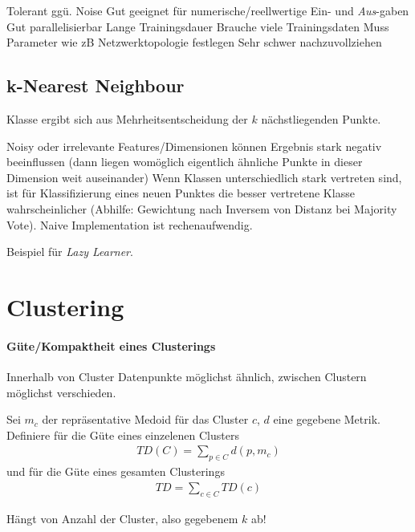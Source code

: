 \documentclass[10pt]{article} %
\begin{document}
\begin{cptitemize}
  \advantageit Tolerant ggü. Noise
  \advantageit Gut geeignet für numerische/reellwertige Ein- und \textit{Aus}-gaben
  \advantageit Gut parallelisierbar
  \disadvantageit Lange Trainingsdauer
  \disadvantageit Brauche viele Trainingsdaten
  \disadvantageit Muss Parameter wie zB Netzwerktopologie festlegen
  \disadvantageit Sehr schwer nachzuvollziehen
\end{cptitemize}

\subsection{k-Nearest Neighbour} 
Klasse ergibt sich aus Mehrheitsentscheidung der $k$ nächstliegenden Punkte.
\begin{cptitemize}
  \disadvantageit Noisy oder irrelevante Features/Dimensionen können Ergebnis
  stark negativ beeinflussen (dann liegen womöglich eigentlich ähnliche Punkte in
  dieser Dimension weit auseinander)
  \disadvantageit Wenn Klassen unterschiedlich stark vertreten sind, ist für
  Klassifizierung eines neuen Punktes die besser vertretene Klasse
  wahrscheinlicher (Abhilfe: Gewichtung nach Inversem von Distanz bei Majority Vote).
  \disadvantageit Naive Implementation ist rechenaufwendig.
\end{cptitemize}
Beispiel für \textit{Lazy Learner}.

\pagebreak
\section{Clustering}
\label{sec:clustering-algorithms}
\localtableofcontents

 \paragraph{Güte/Kompaktheit eines Clusterings} 
Innerhalb von Cluster Datenpunkte möglichst ähnlich, zwischen Clustern möglichst verschieden.
 \begin{definition}[TD] 
 Sei $m_c$ der repräsentative Medoid für das Cluster $c$, $d$ eine gegebene Metrik. Definiere für die Güte eines einzelenen Clusters
 \begin{align*} 
     TD(C) = \sum_{p \in C} d(p,m_c) 
 \end{align*}
 und für die Güte eines gesamten Clusterings
 \begin{align*} 
     TD = \sum_{c \in C} TD(c) 
 \end{align*} 
 \begin{cptitemize} 
      \disadvantageit Hängt von Anzahl der Cluster, also gegebenem $k$ ab! 
 \end{cptitemize} 
 \end{definition} 
\end{document}
